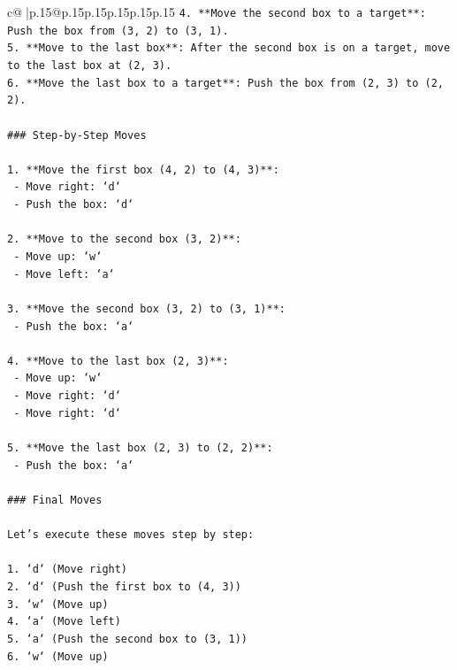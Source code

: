 \documentclass{article}
\begin{document}
{\begin{supertabular}{c@{$\;$}|p{.15\linewidth}@{}p{.15\linewidth}p{.15\linewidth}p{.15\linewidth}p{.15\linewidth}p{.15\linewidth}}
{{{\texttt{4. **Move the second box to a target**: Push the box from (3, 2) to (3, 1).} \\
\texttt{5. **Move to the last box**: After the second box is on a target, move to the last box at (2, 3).} \\
\texttt{6. **Move the last box to a target**: Push the box from (2, 3) to (2, 2).} \\
\\ 
\texttt{\#\#\# Step{-}by{-}Step Moves} \\
\\ 
\texttt{1. **Move the first box (4, 2) to (4, 3)**:} \\
\texttt{   {-} Move right: `d`} \\
\texttt{   {-} Push the box: `d`} \\
\\ 
\texttt{2. **Move to the second box (3, 2)**:} \\
\texttt{   {-} Move up: `w`} \\
\texttt{   {-} Move left: `a`} \\
\\ 
\texttt{3. **Move the second box (3, 2) to (3, 1)**:} \\
\texttt{   {-} Push the box: `a`} \\
\\ 
\texttt{4. **Move to the last box (2, 3)**:} \\
\texttt{   {-} Move up: `w`} \\
\texttt{   {-} Move right: `d`} \\
\texttt{   {-} Move right: `d`} \\
\\ 
\texttt{5. **Move the last box (2, 3) to (2, 2)**:} \\
\texttt{   {-} Push the box: `a`} \\
\\ 
\texttt{\#\#\# Final Moves} \\
\\ 
\texttt{Let's execute these moves step by step:} \\
\\ 
\texttt{1. `d` (Move right)} \\
\texttt{2. `d` (Push the first box to (4, 3))} \\
\texttt{3. `w` (Move up)} \\
\texttt{4. `a` (Move left)} \\
\texttt{5. `a` (Push the second box to (3, 1))} \\
\texttt{6. `w` (Move up)} \\
}}}
\end{supertabular}}
\end{document}
